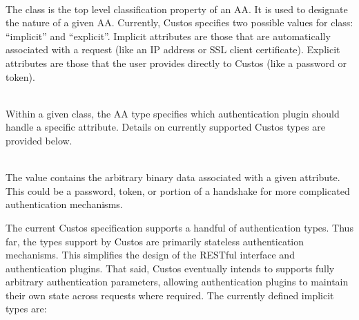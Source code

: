 \begin{packed_desc}
\item[Class] \hfill \\ The class is the top level classification
  property of an AA. It is used to designate the nature of a given
  AA. Currently, Custos specifies two possible values for class:
  ``implicit'' and ``explicit''. Implicit attributes are those that
  are automatically associated with a request (like an IP address or
  SSL client certificate). Explicit attributes are those that the user
  provides directly to Custos (like a password or token).
\item[Type] \hfill \\ Within a given class, the AA type specifies which
  authentication plugin should handle a specific attribute. Details on
  currently supported Custos types are provided below.
\item[Value] \hfill \\ The value contains the arbitrary binary data
  associated with a given attribute. This could be a password, token,
  or portion of a handshake for more complicated authentication
  mechanisms.
\end{packed_desc}

The current Custos specification supports a handful of authentication
types. Thus far, the types support by Custos are primarily stateless
authentication mechanisms. This simplifies the design of the RESTful
interface and authentication plugins. That said, Custos eventually
intends to supports fully arbitrary authentication parameters,
allowing authentication plugins to maintain their own state across
requests where required. The currently defined implicit types are:

